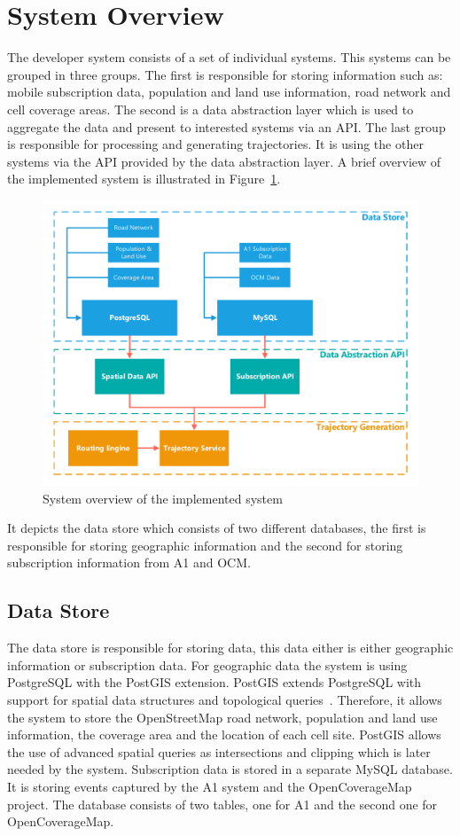\documentclass[master,english]{hgbthesis}
\begin{document}
\section{System Overview}
The developer system consists of a set of individual systems. This systems can be grouped in three groups. The first is responsible for storing information such as: mobile subscription data, population and land use information, road network and cell coverage areas. The second is a data abstraction layer which is used to aggregate the data and present to interested systems via an API. The last group is responsible for processing and generating trajectories. It is using the other systems via the API provided by the data abstraction layer. A brief overview of the implemented system is illustrated in Figure~\ref{fig:systemoverview}.
\begin{figure}
\centering
\includegraphics[width=\linewidth]{./images/systemoverview}
\caption{System overview of the implemented system}
\label{fig:systemoverview}
\end{figure}
It depicts the data store which consists of two different databases, the first is responsible for storing geographic information and the second for storing subscription information from A1 and OCM.
\subsection{Data Store}
The data store is responsible for storing data, this data either is either geographic information or subscription data. For geographic data the system is using PostgreSQL with the PostGIS extension. PostGIS extends PostgreSQL with support for spatial data structures and topological queries~\cite{Obe2011}. Therefore, it allows the system to store the OpenStreetMap road network, population and land use information, the coverage area and the location of each cell site. PostGIS allows the use of advanced spatial queries as intersections and clipping which is later needed by the system.
Subscription data is stored in a separate MySQL database. It is storing events captured by the A1 system and the OpenCoverageMap project. The database consists of two tables, one for A1 and the second one for OpenCoverageMap.
\end{document}

